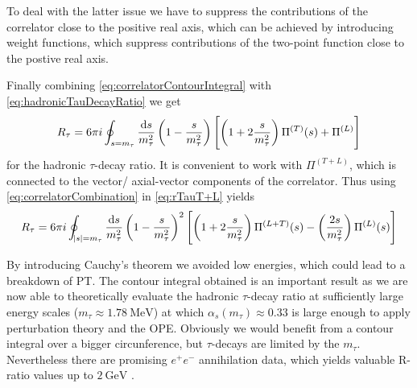 \documentclass[../../index.tex]{subfiles}
\begin{document}
To deal with the latter issue we have to suppress the contributions of the
correlator close to the positive real axis, which can be achieved by introducing
weight functions, which suppress contributions of the two-point function close
to the postive real axis.

Finally combining \cref{eq:correlatorContourIntegral} with
\cref{eq:hadronicTauDecayRatio} we get
\begin{equation}
  \label{eq:rTauT+L}
  R_\tau = 6 \pi i \oint_{s=m_\tau} \frac{\dif s}{m_\tau^2}
  \left( 1 - \frac{s}{m_\tau^2} \right)
  \left[ \left( 1 + 2 \frac{s}{m_\tau^2} \right) \Pi^{(T)}(s) + \Pi^{(L)} \right]
\end{equation}
for the hadronic $\tau$-decay ratio. It is convenient to work with
$\Pi^{(T+L)}$, which is connected to the vector/ axial-vector components of the
correlator. Thus using \cref{eq:correlatorCombination} in \cref{eq:rTauT+L} yields
\begin{equation}
  R_\tau = 6 \pi i \oint_{\abs{s}=m_\tau} \frac{\dif s}{m_\tau^2} \left( 1 - \frac{s}{m_\tau^2} \right)^2 \left[ \left( 1 + 2 \frac{s}{m_\tau^2} \right) \Pi^{(L+T)}(s) - \left( \frac{2 s}{m_\tau^2} \right) \Pi^{(L)}(s) \right]
\end{equation}

By introducing Cauchy's theorem we avoided low energies, which could lead to a
breakdown of PT. The contour integral obtained is an important result as we are
now able to theoretically evaluate the hadronic $\tau$-decay ratio at
sufficiently large energy scales ($m_\tau \approx \SI{1.78}{\mega\eV}$)
at which $\alpha_s(m_\tau)\approx 0.33$ \cite{Pich2016} is large enough to
apply perturbation theory and the OPE. Obviously we would benefit from a
contour integral over a bigger circunference, but $\tau$-decays are limited by the $m_\tau$.
Nevertheless there are promising $e^+e^-$ annihilation data, which yields
valuable R-ratio values up to $\SI{2}{\giga\electronvolt}$
\cite{Boito2018}\cite{Keshavarzi2018}.
\end{document}
